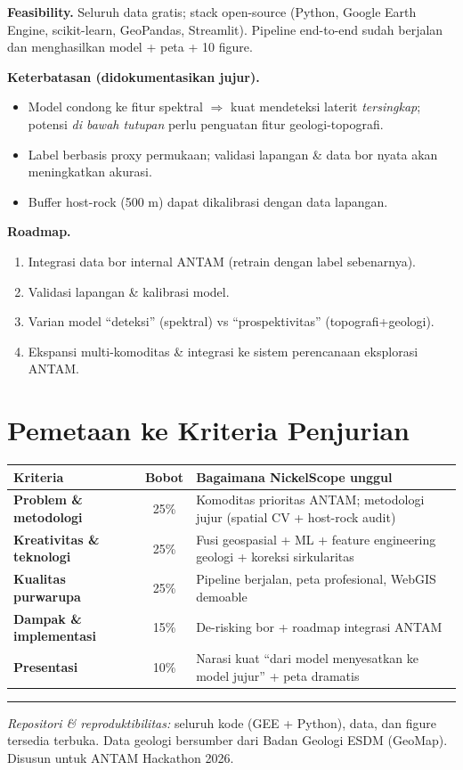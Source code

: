 \documentclass[11pt,a4paper]{article}
\begin{document}
\textbf{Feasibility.} Seluruh data gratis; stack open-source (Python, Google Earth
Engine, scikit-learn, GeoPandas, Streamlit). Pipeline end-to-end sudah berjalan
dan menghasilkan model + peta + 10 figure.

\textbf{Keterbatasan (didokumentasikan jujur).}
\begin{itemize}
  \item Model condong ke fitur spektral $\Rightarrow$ kuat mendeteksi laterit
  \textit{tersingkap}; potensi \textit{di bawah tutupan} perlu penguatan fitur geologi-topografi.
  \item Label berbasis proxy permukaan; validasi lapangan \& data bor nyata akan meningkatkan akurasi.
  \item Buffer host-rock (500 m) dapat dikalibrasi dengan data lapangan.
\end{itemize}

\textbf{Roadmap.}
\begin{enumerate}
  \item Integrasi data bor internal ANTAM (retrain dengan label sebenarnya).
  \item Validasi lapangan \& kalibrasi model.
  \item Varian model ``deteksi'' (spektral) vs ``prospektivitas'' (topografi+geologi).
  \item Ekspansi multi-komoditas \& integrasi ke sistem perencanaan eksplorasi ANTAM.
\end{enumerate}

\section{Pemetaan ke Kriteria Penjurian}

\begin{tabularx}{\linewidth}{@{}>{\bfseries}l c Y@{}}
\toprule
Kriteria & Bobot & Bagaimana NickelScope unggul \\
\midrule
Problem \& metodologi   & 25\% & Komoditas prioritas ANTAM; metodologi jujur (spatial CV + host-rock audit) \\
Kreativitas \& teknologi & 25\% & Fusi geospasial + ML + feature engineering geologi + koreksi sirkularitas \\
Kualitas purwarupa      & 25\% & Pipeline berjalan, peta profesional, WebGIS demoable \\
Dampak \& implementasi  & 15\% & De-risking bor + roadmap integrasi ANTAM \\
Presentasi              & 10\% & Narasi kuat ``dari model menyesatkan ke model jujur'' + peta dramatis \\
\bottomrule
\end{tabularx}

\vspace{1em}\hrule\vspace{0.5em}
{\small\color{darkgray}\textit{Repositori \& reproduktibilitas:} seluruh kode
(GEE + Python), data, dan figure tersedia terbuka. Data geologi bersumber dari
Badan Geologi ESDM (GeoMap). Disusun untuk ANTAM Hackathon 2026.}
\end{document}

